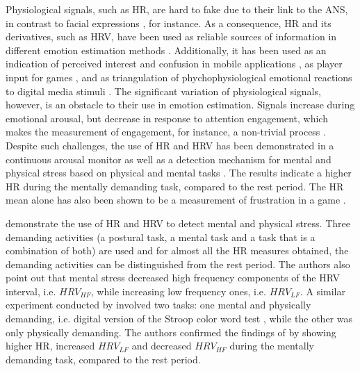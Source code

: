 Physiological signals, such as HR, are hard to fake due to their link to the ANS, in contrast to facial expressions \parencite{Landowska}, for instance. As a consequence, HR and its derivatives, such as HRV, have been used as reliable sources of information in different emotion estimation methods \parencite{kukolja2014comparative}. Additionally, it has been used as an indication of perceived interest and confusion in mobile applications \parencite{xiao2015towards}, as player input for games \parencite{stockhausen2013beats}, and as triangulation of phychophysiological emotional reactions to digital media stimuli \parencite{nogueira2015annotation}. The significant variation of physiological signals, however, is an obstacle to their use in emotion estimation. Signals increase during emotional arousal, but decrease in response to attention engagement, which makes the measurement of engagement, for instance, a non-trivial process \parencite{ravaja20051}. Despite such challenges, the use of HR and HRV has been demonstrated in a continuous arousal monitor \parencite{grundlehner2009design} as well as a detection mechanism for mental and physical stress based on physical and mental tasks \parencite{vandeput2009heart,garde2002effects}. The results indicate a higher HR during the mentally demanding task, compared to the rest period. The HR mean alone has also been shown to be a measurement of frustration in a game \parencite{rodriguez2015vr}.


\textcite{vandeput2009heart} demonstrate the use of HR and HRV to detect mental and physical stress. Three demanding activities (a postural task, a mental task and a task that is a combination of both) are used and for almost all the HR measures obtained, the demanding activities can be distinguished from the rest period. The authors also point out that mental stress decreased high frequency components of the HRV interval, i.e. $HRV_{HF}$, while increasing low frequency ones, i.e. $HRV_{LF}$. A similar experiment conducted by \textcite{garde2002effects} involved two tasks: one mental and physically demanding, i.e. digital version of the Stroop color word test \parencite{golden1978stroop}, while the other was only physically demanding. The authors confirmed the findings of \textcite{vandeput2009heart} by showing higher HR, increased $HRV_{LF}$ and decreased $HRV_{HF}$ during the mentally demanding task, compared to the rest period.


